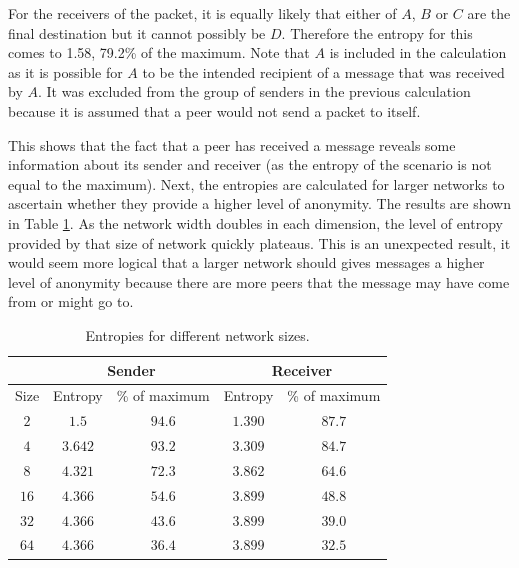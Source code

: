 \documentclass[ %
                    author={Luke Murray},
                supervisor={Dr. Simon Hollis},
                     title={Shadow Peer-to-Peer Networks},
                  subtitle={},
                    degree={MEng},
                      year={2013} ]{thesis}
\begin{document}
For the receivers of the packet, it is equally likely that either of $A$, $B$ or $C$ are the final destination but it cannot possibly be $D$. Therefore the entropy for this comes to 1.58, 79.2\% of the maximum. Note that $A$ is included in the calculation as it is possible for $A$ to be the intended recipient of a message that was received by $A$. It was excluded from the group of senders in the previous calculation because it is assumed that a peer would not send a packet to itself.

This shows that the fact that a peer has received a message reveals some information about its sender and receiver (as the entropy of the scenario is not equal to the maximum). Next, the entropies are calculated for larger networks to ascertain whether they provide a higher level of anonymity. The results are shown in Table \ref{entropy_table}. As the network width doubles in each dimension, the level of entropy provided by that size of network quickly plateaus. This is an unexpected result, it would seem more logical that a larger network should gives messages a higher level of anonymity because there are more peers that the message may have come from or might go to.



\begin{table}[t]
\centering
\begin{tabular}{|c|cc|cc|}
\hline
 & \multicolumn{2}{|c|}{Sender} & \multicolumn{2}{|c|}{Receiver} \\
\hline
Size & Entropy & \% of maximum & Entropy & \% of maximum \\
\hline
$2$ & $1.5$ & $94.6$ & $1.390$ & $87.7$\\
$4$ & $3.642$ & $93.2$ & $3.309$ & $84.7$\\
$8$ & $4.321$ & $72.3$ & $3.862$ & $64.6$\\
$16$ & $4.366$ & $54.6$ & $3.899$ & $48.8$\\
$32$ & $4.366$ & $43.6$ & $3.899$ & $39.0$\\
$64$ & $4.366$ & $36.4$ & $3.899$ & $32.5$\\
\hline
\end{tabular}
\caption{Entropies for different network sizes.}
\label{entropy_table}
\end{table}
\end{document}
